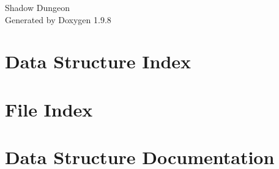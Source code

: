\documentclass[twoside]{book}
\newcommand{\+}{\discretionary{\mbox{\scriptsize$\hookleftarrow$}}{}{}}
\newcommand{\clearemptydoublepage}{%
    \newpage{\pagestyle{empty}\cleardoublepage}%
  }
\begin{document}
  \raggedbottom
    \hypersetup{pageanchor=false,
                bookmarksnumbered=true,
                pdfencoding=unicode
               }
  \begin{titlepage}
  \vspace*{7cm}
  \begin{center}%
  {\Large Shadow Dungeon}\\
  \vspace*{1cm}
  {\large Generated by Doxygen 1.9.8}\\
  \end{center}
  \end{titlepage}
  \clearemptydoublepage
  \tableofcontents
  \clearemptydoublepage
  \hypersetup{pageanchor=true}
\chapter{Data Structure Index}

\chapter{File Index}

\chapter{Data Structure Documentation}








\end{document}
